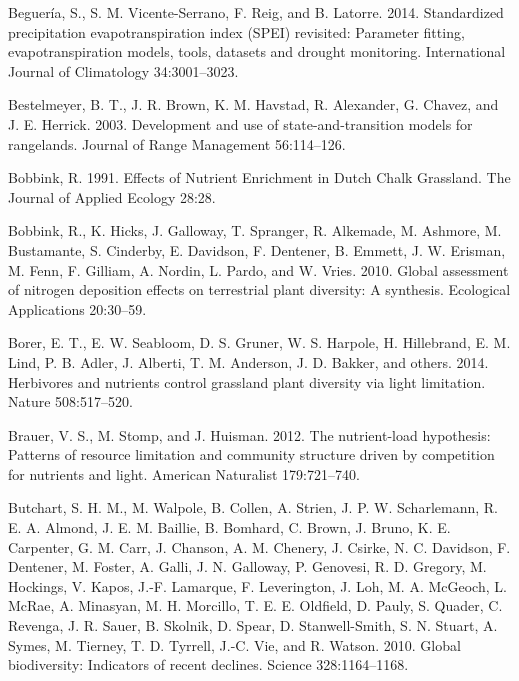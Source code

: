 \documentclass[twoside,12pt,final]{ucthesis-CA2012}
\newlength{\cslhangindent}
\newenvironment{cslreferences}%
  {\setlength{\parindent}{0pt}%
  \everypar{\setlength{\hangindent}{\cslhangindent}}\ignorespaces}%
  {\par}
\begin{document}
\begin{ucmainmatter}
\begin{cslreferences}
\leavevmode\hypertarget{ref-Begueria2014}{}%
Beguería, S., S. M. Vicente-Serrano, F. Reig, and B. Latorre. 2014. Standardized precipitation evapotranspiration index (SPEI) revisited: Parameter fitting, evapotranspiration models, tools, datasets and drought monitoring. International Journal of Climatology 34:3001--3023.

\leavevmode\hypertarget{ref-Bestelmeyer2003}{}%
Bestelmeyer, B. T., J. R. Brown, K. M. Havstad, R. Alexander, G. Chavez, and J. E. Herrick. 2003. Development and use of state-and-transition models for rangelands. Journal of Range Management 56:114--126.

\leavevmode\hypertarget{ref-Bobbink1991}{}%
Bobbink, R. 1991. Effects of Nutrient Enrichment in Dutch Chalk Grassland. The Journal of Applied Ecology 28:28.

\leavevmode\hypertarget{ref-bobbink2010}{}%
Bobbink, R., K. Hicks, J. Galloway, T. Spranger, R. Alkemade, M. Ashmore, M. Bustamante, S. Cinderby, E. Davidson, F. Dentener, B. Emmett, J. W. Erisman, M. Fenn, F. Gilliam, A. Nordin, L. Pardo, and W. Vries. 2010. Global assessment of nitrogen deposition effects on terrestrial plant diversity: A synthesis. Ecological Applications 20:30--59.

\leavevmode\hypertarget{ref-Borer2014a}{}%
Borer, E. T., E. W. Seabloom, D. S. Gruner, W. S. Harpole, H. Hillebrand, E. M. Lind, P. B. Adler, J. Alberti, T. M. Anderson, J. D. Bakker, and others. 2014. Herbivores and nutrients control grassland plant diversity via light limitation. Nature 508:517--520.

\leavevmode\hypertarget{ref-Brauer2012}{}%
Brauer, V. S., M. Stomp, and J. Huisman. 2012. The nutrient-load hypothesis: Patterns of resource limitation and community structure driven by competition for nutrients and light. American Naturalist 179:721--740.

\leavevmode\hypertarget{ref-butchart2010}{}%
Butchart, S. H. M., M. Walpole, B. Collen, A. Strien, J. P. W. Scharlemann, R. E. A. Almond, J. E. M. Baillie, B. Bomhard, C. Brown, J. Bruno, K. E. Carpenter, G. M. Carr, J. Chanson, A. M. Chenery, J. Csirke, N. C. Davidson, F. Dentener, M. Foster, A. Galli, J. N. Galloway, P. Genovesi, R. D. Gregory, M. Hockings, V. Kapos, J.-F. Lamarque, F. Leverington, J. Loh, M. A. McGeoch, L. McRae, A. Minasyan, M. H. Morcillo, T. E. E. Oldfield, D. Pauly, S. Quader, C. Revenga, J. R. Sauer, B. Skolnik, D. Spear, D. Stanwell-Smith, S. N. Stuart, A. Symes, M. Tierney, T. D. Tyrrell, J.-C. Vie, and R. Watson. 2010. Global biodiversity: Indicators of recent declines. Science 328:1164--1168.


\end{cslreferences}
\end{ucmainmatter}
\end{document}
